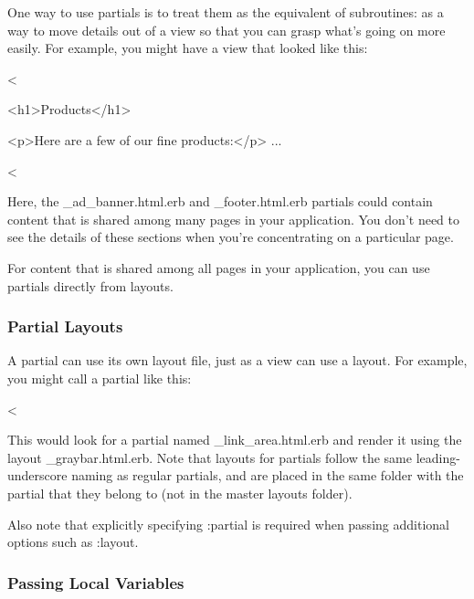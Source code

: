 \documentclass[10pt]{book}
\newenvironment{code}{%
  \scriptsize
    \verbatim
}{%
    \endverbatim
    \newline
}
\begin{document}
One way to use partials is to treat them as the equivalent of  subroutines: as a way to move details out of a view so that you can  grasp what’s going on more easily. For example, you might have a view  that looked like this:
\begin{code}
<%
 
<h1>Products</h1>
 
<p>Here are a few of our fine products:</p>
...
 
<%
\end{code}

Here, the \_ad\_banner.html.erb and \_footer.html.erb  partials could contain content that is shared among many pages in your  application. You don’t need to see the details of these sections when  you’re concentrating on a particular page.

For content that is shared among all pages in your application, you can use partials directly from layouts.

\subsubsection{ Partial Layouts}

A partial can use its own layout file, just as a view can use a layout. For example, you might call a partial like this:
\begin{code}
<%
\end{code}

This would look for a partial named \_link\_area.html.erb and render it using the layout \_graybar.html.erb.  Note that layouts for partials follow the same leading-underscore  naming as regular partials, and are placed in the same folder with the  partial that they belong to (not in the master layouts folder).

Also note that explicitly specifying :partial is required when passing additional options such as :layout.

\subsubsection{ Passing Local Variables}
\end{document}
